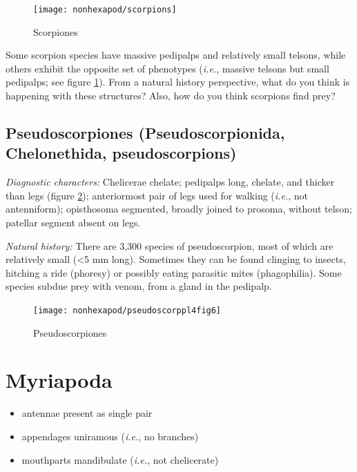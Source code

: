 \begin{figure}[ht!]
  \centering
    \texttt{[image: nonhexapod/scorpions]}
  \caption{Scorpiones \cite[][Plate 18, Figs. 1, 1b, 2]{bhlitem239255}}
  \label{fig:scorpion}
\end{figure}

\begin{theo}
{}Some scorpion species have massive pedipalps and relatively small telsons, while others exhibit the opposite set of phenotypes (\textit{i.e.}, massive telsons but small pedipalps; see figure \ref{fig:scorpion}). From a natural history perspective, what do you think is happening with these structures? Also, how do you think scorpions find prey?
\end{theo} %

\subsection{Pseudoscorpiones (Pseudoscorpionida, Chelonethida, pseudoscorpions)}
\noindent{}\textit{Diagnostic characters:} Chelicerae chelate; pedipalps long, chelate, and thicker than legs (figure \ref{fig:pseudo}); anteriormost pair of legs used for walking (\textit{i.e.}, not antenniform); opisthosoma segmented, broadly joined to prosoma, without telson; patellar segment absent on legs.\vspace{3mm}

\noindent{}\textit{Natural history:} There are 3,300 species of pseudoscorpion, most of which are relatively small (\textless5 mm long). Sometimes they can be found clinging to insects, hitching a ride (phoresy) or possibly eating parasitic mites (phagophilia). Some species subdue prey with venom, from a gland in the pedipalp.\vspace{3mm}

\begin{figure}[ht!]
  \centering
    \texttt{[image: nonhexapod/pseudoscorppl4fig6]}
  \caption{Pseudoscorpiones \citep[][Plate IV, Fig. 6]{bhlitem260979pseudo}}
  \label{fig:pseudo}
\end{figure}

\section{Myriapoda}
\begin{itemize}
\item antennae present as single pair
\item appendages uniramous (\textit{i.e.}, no branches)
\item mouthparts mandibulate (\textit{i.e.}, not chelicerate)
\end{itemize}

